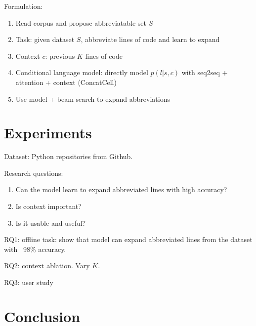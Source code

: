 \documentclass[letterpaper]{article} %
\begin{document}
Formulation: 

\begin{enumerate}
  \item{Read corpus and propose abbreviatable set $S$}
  \item{Task: given dataset $S$, abbreviate lines of code and learn to expand}
  \item{Context $c$: previous $K$ lines of code}
  \item{Conditional language model: directly model $p(l | s, c)$ with seq2seq + attention + context (ConcatCell)}
  \item{Use model + beam search to expand abbreviations}
\end{enumerate}

\section{Experiments}
\label{sec:exp}

Dataset: Python repositories from Github.

Research questions:

\begin{enumerate}
  \item{Can the model learn to expand abbreviated lines with high accuracy?}
  \item{Is context important?}
  \item{Is it usable and useful?}
\end{enumerate}

RQ1: offline task: show that model can expand abbreviated lines from the dataset
with ~98\% accuracy.

RQ2: context ablation. Vary $K$.

RQ3: user study

\section{Conclusion}
\label{sec:conclusion}
\end{document}
